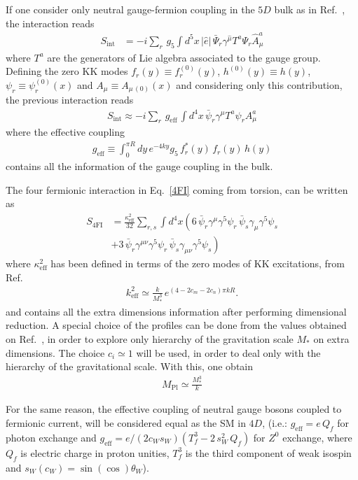If one consider only neutral gauge-fermion coupling in the $5D$ bulk as in Ref.~\cite{Davoudiasl:1999tf}, the interaction reads
\begin{align}
S_{\text{int}} &= -i\sum_{r}\,g_5\int d^5x\,|\hat{e}|\,\bar{\Psi}_r \gamma^{\hat{\mu}}T^a\Psi_r\hat{A}_\mu^a
\end{align}
where $T^a$ are the generators of Lie algebra associated to the gauge group. Defining the zero KK modes $f_r(y)\equiv f_r^{(0)}(y)$, $h^{(0)}(y)\equiv h(y)$, $\psi_r\equiv\psi_r^{(0)}(x)$ and $A_\mu\equiv A_{\mu\,(0)}(x)$ and considering only this contribution, the previous interaction reads
\begin{align}
S_{\text{int}} \approx -i \sum_{r}\,g_{\text{eff}}\,\int d^4x\,\bar{\psi}_r\gamma^\mu T^a\psi_r A_\mu^a
\end{align}
where the effective coupling
\begin{align}
 g_{\text{eff}} \equiv \int_0^{\pi R}dy\,e^{-4ky}g_5\,f_r^*(y)\,f_r(y)\,h(y)
\end{align}
contains all the information of the gauge coupling in the bulk.

The four fermionic interaction in Eq.~\eqref{4FI} coming from torsion, can be written as
\begin{align}
\nonumber
 S_{4\text{FI}} &= \frac{\kappa_{\text{eff}}^2}{32}\sum_{r,s}\int d^4x\left(6\,\bar{\psi}_{r}\gamma^\mu\gamma^5\psi_{r}\,\bar{\psi}_{s}\gamma_\mu\gamma^5\psi_{s}\right.\\
 \label{4FI5D}
 &+\left. 3\,\bar{\psi}_r\gamma^{\mu\nu}\gamma^5\psi_r\,\bar{\psi}_s\gamma_{\mu\nu}\gamma^5\psi_s\right)
\end{align}
where $\kappa_{\text{eff}}^2$ has been defined in terms of the zero modes of KK excitations, from Ref.~\cite{Gherghetta:2000qt}
\begin{align}
 k_{\text{eff}}^2 \simeq \frac{k}{M_*^3}\,e^{(4-2c_m-2c_n)\pi kR}.
\end{align}
and contains all the extra dimensions information after performing dimensional reduction. A special choice of the profiles can be done from the values obtained on Ref.~\cite{Gherghetta:2006ha}, in order to explore only hierarchy of the gravitation scale $M_*$ on extra dimensions. The choice $c_i\simeq1$ will be used, in order to deal only with the hierarchy of the gravitational scale. With this, one obtain
\begin{align}
 M_{\text{Pl}} \simeq \frac{M_*^3}{k}
\end{align}

For the same reason, the effective coupling of neutral gauge bosons coupled to fermionic current, will be considered equal as the SM in $4D$, (i.e.: $g_{\text{eff}} = e\,Q_f$ for photon exchange and $g_{\text{eff}} = e/(2c_Ws_W)\left(T^3_f - 2\,s_W^2\,Q_f\right)$ for $Z^0$ exchange, where $Q_f$ is electric charge in proton unities, $T_f^3$ is the third component of weak isospin and $s_W(c_W) = \sin(\cos)\theta_W$). 

